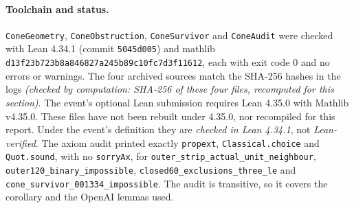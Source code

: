 \documentclass[11pt]{article}
\theoremstyle{definition}
\theoremstyle{remark}
\begin{document}
\paragraph{Toolchain and status.} \texttt{Cone\allowbreak{}Geometry},
\texttt{Cone\allowbreak{}Obstruction}, \texttt{ConeSurvivor} and \texttt{ConeAudit} were
checked with Lean 4.34.1 (commit \texttt{5045d005}) and mathlib
\texttt{d13f23b723b8a846827a245b89c10fc7d3f11612}, each with exit code $0$
and no errors or warnings. The four archived sources match the SHA-256
hashes in the logs \emph{(checked by computation: SHA-256 of these four
files, recomputed for this section)}.
The event's optional Lean submission requires Lean 4.35.0 with Mathlib
v4.35.0. These files have not been rebuilt under 4.35.0, nor recompiled for
this report. Under the event's definition they are \emph{checked in Lean
4.34.1}, not \emph{Lean-verified}.
The axiom audit printed exactly \texttt{propext}, \texttt{Classical.\allowbreak{}choice}
and \texttt{Quot.sound}, with no \texttt{sorryAx}, for
\texttt{outer\_\allowbreak{}strip\_\allowbreak{}actual\_\allowbreak{}unit\_\allowbreak{}neighbour},
\texttt{outer120\_\allowbreak{}binary\_\allowbreak{}impossible}, \texttt{closed60\_\allowbreak{}exclusions\_\allowbreak{}three\_\allowbreak{}le}
and \texttt{cone\_\allowbreak{}survivor\_\allowbreak{}001334\_\allowbreak{}impossible}. The audit is transitive, so
it covers the corollary and the OpenAI lemmas used.
\end{document}
